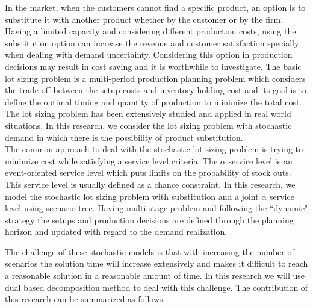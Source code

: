 \documentclass[10pt]{article}
\begin{document}
In the market, when the customers cannot find a specific product, an option is to substitute it with another product whether by the customer or by the firm. Having a limited capacity and considering different production costs, using the substitution option can increase the revenue and customer satisfaction specially when dealing with demand uncertainty. Considering this option in production decisions may result in cost saving and it is worthwhile to investigate.
The basic lot sizing problem is a multi-period production planning problem which considers the trade-off between the setup costs and inventory holding cost and its goal is to define the optimal timing and quantity of production to minimize the total cost. The lot sizing problem has been extensively studied and applied in real world situations. In this research, we consider the  lot sizing problem with stochastic demand in which there is the possibility of product substitution. \\
The common approach to deal with the stochastic lot sizing problem is trying to minimize cost while satisfying a service level criteria. The $\alpha$ service level is an event-oriented service level which puts limits on the probability of stock outs. This service level is usually defined as a chance constraint. 
In this research, we model the stochastic lot sizing problem with substitution and a joint $\alpha$ service level using scenario tree.
Having multi-stage problem and following the ``dynamic" strategy \cite{bookbinder1988strategies} the setups and production decisions are defined through the planning horizon and updated with regard to the demand realization. 

The challenge of these stochastic models is that with increasing the number of scenarios the solution time will increase extensively and makes it difficult to reach a reasonable solution in a reasonable amount of time. In this research we will use dual based decomposition method to deal with this challenge. 
The contribution of this research can be summarized as follows:
\end{document}
